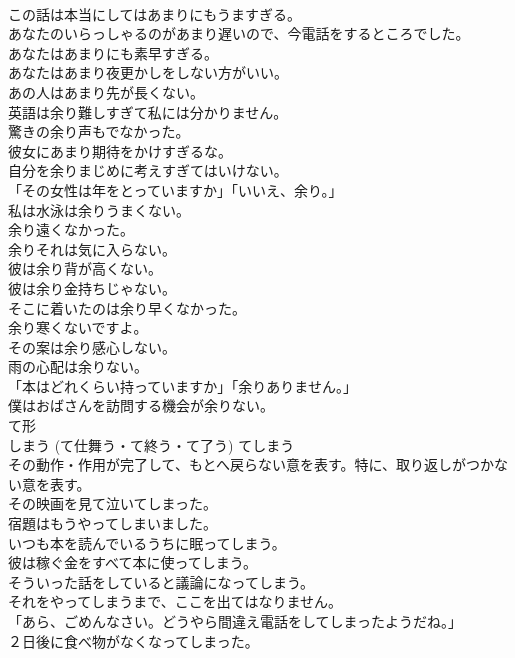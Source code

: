 \documentclass[8pt]{extreport}
\begin{document}
\begin{CJK}{UTF8}{min}
\\	この話は本当にしてはあまりにもうますぎる。  
\\	あなたのいらっしゃるのがあまり遅いので、今電話をするところでした。   
\\	あなたはあまりにも素早すぎる。  
\\	あなたはあまり夜更かしをしない方がいい。  
\\	あの人はあまり先が長くない。  
\\	英語は余り難しすぎて私には分かりません。   
\\	驚きの余り声もでなかった。  
\\	彼女にあまり期待をかけすぎるな。  
\\	自分を余りまじめに考えすぎてはいけない。  
\\	「その女性は年をとっていますか」「いいえ、余り。」  
\\	私は水泳は余りうまくない。  
\\	余り遠くなかった。  
\\	余りそれは気に入らない。  
\\	彼は余り背が高くない。   
\\	彼は余り金持ちじゃない。   
\\	そこに着いたのは余り早くなかった。   
\\	余り寒くないですよ。   
\\	その案は余り感心しない。   
\\	雨の心配は余りない。   
\\	「本はどれくらい持っていますか」「余りありません。」   
\\	僕はおばさんを訪問する機会が余りない。  
\\	て形
\\	しまう (て仕舞う・て終う・て了う)	てしまう	
\\	その動作・作用が完了して、もとへ戻らない意を表す。特に、取り返しがつかない意を表す。	
\\	その映画を見て泣いてしまった。  
\\	宿題はもうやってしまいました。  
\\	いつも本を読んでいるうちに眠ってしまう。  
\\	彼は稼ぐ金をすべて本に使ってしまう。  
\\	そういった話をしていると議論になってしまう。  
\\	それをやってしまうまで、ここを出てはなりません。  
\\	「あら、ごめんなさい。どうやら間違え電話をしてしまったようだね。」  
\\	２日後に食べ物がなくなってしまった。  

\end{CJK}
\end{document}
